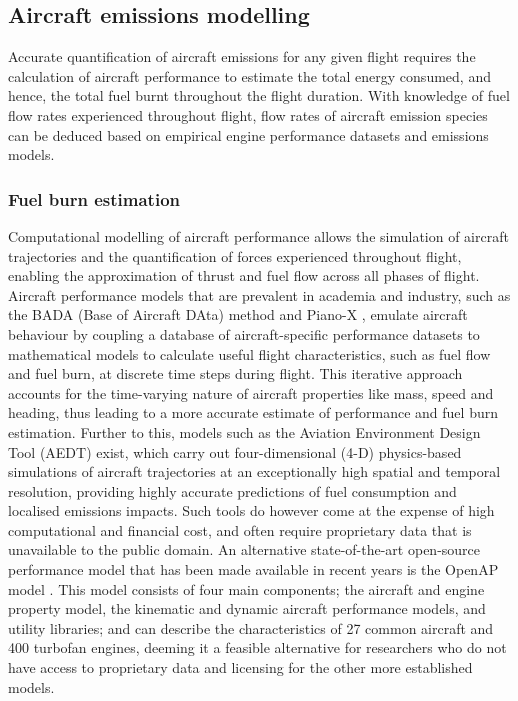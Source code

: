 

\subsection{Aircraft emissions modelling}
Accurate quantification of aircraft emissions for any given flight requires the calculation of aircraft performance to estimate the total energy consumed, and hence, the total fuel burnt throughout the flight duration. With knowledge of fuel flow rates experienced throughout flight, flow rates of aircraft emission species can be deduced based on empirical engine performance datasets and emissions models.

\subsubsection{Fuel burn estimation}
Computational modelling of aircraft performance allows the simulation of aircraft trajectories and the quantification of forces experienced throughout flight, enabling the approximation of thrust and fuel flow across all phases of flight. Aircraft performance models that are prevalent in academia and industry, such as the BADA (Base of Aircraft DAta) method \cite{Nuic2010} and Piano-X \cite{PIANO_X}, emulate aircraft behaviour by coupling a database of aircraft-specific performance datasets to mathematical models to calculate useful flight characteristics, such as fuel flow and fuel burn, at discrete time steps during flight. This iterative approach accounts for the time-varying nature of aircraft properties like mass, speed and heading, thus leading to a more accurate estimate of performance and fuel burn estimation. Further to this, models such as the Aviation Environment Design Tool (AEDT) \cite{AEDT} exist, which carry out four-dimensional (4-D) physics-based simulations of aircraft trajectories at an exceptionally high spatial and temporal resolution, providing highly accurate predictions of fuel consumption and localised emissions impacts. Such tools do however come at the expense of high computational and financial cost, and often require proprietary data that is unavailable to the public domain. An alternative state-of-the-art open-source performance model that has been made available in recent years is the OpenAP model \cite{Sun2020}. This model consists of four main components; the aircraft and engine property model, the kinematic and dynamic aircraft performance models, and utility libraries; and can describe the characteristics of 27 common aircraft and 400 turbofan engines, deeming it a feasible alternative for researchers who do not have access to proprietary data and licensing for the other more established models. 

